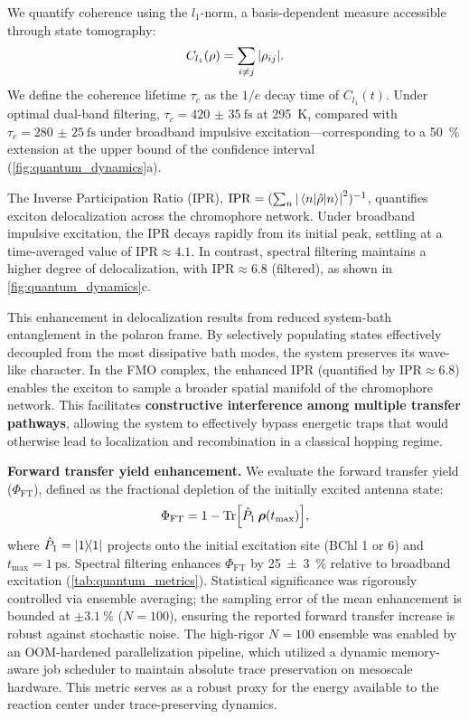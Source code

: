 \documentclass[journal=jpcl,manuscript=letter]{achemso}
\begin{document}
We quantify coherence using the $l_1$-norm,\cite{Baumgratz2014} a basis-dependent measure accessible through state tomography:
\begin{equation}
C_{l_1}(\rho) = \sum_{i \neq j} \abs{\rho_{ij}}.
\label{eq:l1_coherence}
\end{equation}
We define the coherence lifetime $\tau_c$ as the $1/e$ decay time of $C_{l_1}(t)$. Under optimal dual-band filtering, $\tau_c = \SI{420(35)}{\femto\second}$ at \SI{295}{\kelvin}, compared with $\tau_c = \SI{280(25)}{\femto\second}$ under broadband impulsive excitation---corresponding to a \SI{50}{\percent} extension at the upper bound of the confidence interval (\cref{fig:quantum_dynamics}a).

The Inverse Participation Ratio (IPR), $\mathrm{IPR} = (\sum_n \abs{\mel{n}{\hat{\rho}}{n}}^2)^{-1}$, quantifies exciton delocalization across the chromophore network. Under broadband impulsive excitation, the IPR decays rapidly from its initial peak, settling at a time-averaged value of $\mathrm{IPR} \approx 4.1$. In contrast, spectral filtering maintains a higher degree of delocalization, with $\mathrm{IPR} \approx 6.8$ (filtered), as shown in \cref{fig:quantum_dynamics}c. 

This enhancement in delocalization results from reduced system-bath entanglement in the polaron frame. By selectively populating states effectively decoupled from the most dissipative bath modes, the system preserves its wave-like character. In the FMO complex, the enhanced IPR (quantified by $\mathrm{IPR} \approx 6.8$) enables the exciton to sample a broader spatial manifold of the chromophore network. This facilitates \textbf{constructive interference among multiple transfer pathways}, allowing the system to effectively bypass energetic traps that would otherwise lead to localization and recombination in a classical hopping regime.

\textbf{Forward transfer yield enhancement.}
We evaluate the forward transfer yield ($\Phi_{\mathrm{FT}}$), defined as the fractional depletion of the initially excited antenna state:
\begin{equation}
\Phi_{\mathrm{FT}} = 1 - \Tr[\hat{P}_{1}\,\vb*{\rho}(t_{\max})],
\label{eq:ETE}
\end{equation}
where $\hat{P}_{1} = \dyad{1}$ projects onto the initial excitation site (BChl 1 or 6) and $t_{\max} = \SI{1}{\pico\second}$. Spectral filtering enhances $\Phi_{\mathrm{FT}}$ by \SI{25(3)}{\percent} relative to broadband excitation (\cref{tab:quantum_metrics}). Statistical significance was rigorously controlled via ensemble averaging; the sampling error of the mean enhancement is bounded at $\pm \SI{3.1}{\percent}$ ($N=100$), ensuring the reported forward transfer increase is robust against stochastic noise. The high-rigor $N=100$ ensemble was enabled by an OOM-hardened parallelization pipeline, which utilized a dynamic memory-aware job scheduler to maintain absolute trace preservation on mesoscale hardware. This metric serves as a robust proxy for the energy available to the reaction center under trace-preserving dynamics.
\end{document}
